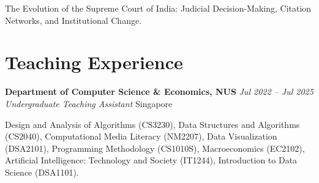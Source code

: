 \documentclass[10pt,a4paper]{article}
\newcommand{\cventry}[4]{%
\textbf{#1} \hfill \textit{#2} \\
\textit{#3} \hfill #4
\vspace{2pt}
}
\newcommand{\cvsubentry}[2]{%
\textbf{#1} \hfill \textit{#2}\vspace{1pt}
}
\begin{document}
\vspace{5pt}

The Evolution of the Supreme Court of India: Judicial Decision-Making, Citation Networks, and Institutional Change.




\section{Teaching Experience}

\cventry{Department of Computer Science \& Economics, NUS}{Jul 2022 -- Jul 2025}{Undergraduate Teaching Assistant}{Singapore}

Design and Analysis of Algorithms (CS3230), Data Structures and Algorithms (CS2040), Computational Media Literacy (NM2207), Data Visualization (DSA2101), Programming Methodology (CS1010S), Macroeconomics (EC2102), Artificial Intelligence: Technology and Society (IT1244), Introduction to Data Science (DSA1101).



\end{document}
